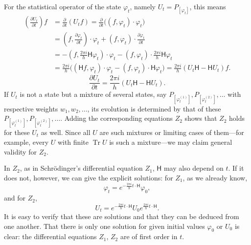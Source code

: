 \documentclass[fontsize=13pt,twoside,openany,headings=normal,parskip=false,bookmarkpackage=false,DIV=calc]{scrbook}
\begin{document}
\hypertarget{origpage-186}{}%
For the statistical operator of the state $\varphi_t$, namely $U_t=P_{[\varphi_t]}$, this means
\begin{align*}
\left(\frac{\partial U_t}{\partial t}\right)f
&=\frac{\partial}{\partial t}(U_tf)
=\frac{\partial}{\partial t}\bigl((f,\varphi_t)\cdot\varphi_t\bigr)\\
&=\left(f,\frac{\partial\varphi_t}{\partial t}\right)\cdot\varphi_t
+(f,\varphi_t)\cdot\frac{\partial\varphi_t}{\partial t}\\
&=-\left(f,\frac{2\pi i}{h}\mathsf{H}\varphi_t\right)\cdot\varphi_t
-(f,\varphi_t)\cdot\frac{2\pi i}{h}\mathsf{H}\varphi_t\\
&=\frac{2\pi i}{h}\bigl((\mathsf{H}f,\varphi_t)\cdot\varphi_t-(f,\varphi_t)\cdot\mathsf{H}\varphi_t\bigr)
=\frac{2\pi i}{h}(U_t\mathsf{H}-\mathsf{H}U_t)f.
\end{align*}
\begin{equation}\tag{$Z_2$}\label{eq:V.1.Z2}
\frac{\partial U_t}{\partial t}=\frac{2\pi i}{h}(U_t\mathsf{H}-\mathsf{H}U_t).
\end{equation}
If $U_t$ is not a state but a mixture of several states, say $P_{[\varphi_t^{(1)}]},P_{[\varphi_t^{(2)}]},\ldots$ with respective weights $w_1,w_2,\ldots$, its evolution is determined by that of these $P_{[\varphi_t^{(1)}]},P_{[\varphi_t^{(2)}]},\ldots$. Adding the corresponding equations \hyperref[eq:V.1.Z2]{$Z_2$} shows that \hyperref[eq:V.1.Z2]{$Z_2$} holds for these $U_t$ as well. Since all $U$ are such mixtures or limiting cases of them---for example, every $U$ with finite $\operatorname{Tr}U$ is such a mixture---we may claim general validity for \hyperref[eq:V.1.Z2]{$Z_2$}.

In \hyperref[eq:V.1.Z2]{$Z_2$}, as in Schr\"odinger's differential equation \hyperref[eq:V.1.Z1]{$Z_1$}, $\mathsf{H}$ may also depend on $t$. If it does not, however, we can give the explicit solutions: for \hyperref[eq:V.1.Z1]{$Z_1$}, as we already know,
\begin{equation}\tag{$Z'_1$}\label{eq:V.1.Z1prime}
\varphi_t=e^{-\frac{2\pi i}{h}t\cdot\mathsf{H}}\varphi_0,
\end{equation}
and for \hyperref[eq:V.1.Z2]{$Z_2$},
\begin{equation}\tag{$Z'_2$}\label{eq:V.1.Z2prime}
U_t=e^{-\frac{2\pi i}{h}t\cdot\mathsf{H}}U_0e^{\frac{2\pi i}{h}t\cdot\mathsf{H}}.
\end{equation}
It is easy to verify that these are solutions and that they can be deduced from one another. That there is only one solution for given initial values $\varphi_0$ or $U_0$ is clear: the differential equations \hyperref[eq:V.1.Z1]{$Z_1$}, \hyperref[eq:V.1.Z2]{$Z_2$} are of first order in $t$.
\end{document}
